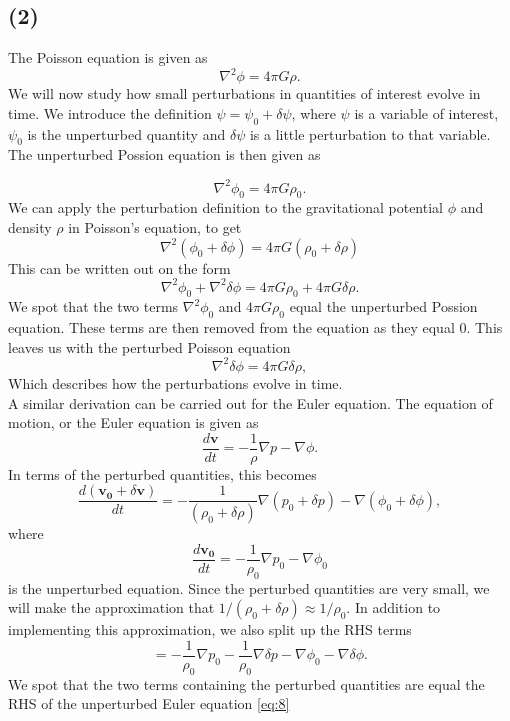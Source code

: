 \documentclass[a4paper]{article}
\begin{document}
\subsection*{(2)}

The Poisson equation is given as
\begin{equation}\label{eq:4}
\nabla^2 \phi = 4 \pi G \rho.
\end{equation}
We will now study how small perturbations in quantities of interest evolve in time. We introduce the definition $\psi = \psi_0 +\delta \psi$, where $\psi$ is a variable of interest, $\psi_0$ is the unperturbed quantity and $\delta \psi$ is a little perturbation to that variable. The unperturbed Possion equation is then given as

\begin{equation}\label{eq:5}
\nabla^2 \phi_0 = 4 \pi G \rho_0.
\end{equation}
We can apply the perturbation definition to the gravitational potential $\phi$ and density $\rho$ in Poisson's equation, to get
\[
\nabla^2 (\phi_0 + \delta \phi) = 4\pi G (\rho_0 + \delta \rho)
\]
This can be written out on the form
\[
\nabla^2 \phi_0 + \nabla^2 \delta \phi = 4 \pi G \rho_0 +4 \pi G \delta \rho.
\]
We spot that the two terms $\nabla^2 \phi_0$ and $4 \pi G \rho_0$ equal the unperturbed Possion equation. These terms are then removed from the equation as they equal 0. This leaves us with the perturbed Poisson equation
\begin{equation}\label{eq:6}
\nabla^2 \delta \phi = 4 \pi G \delta \rho,
\end{equation}
Which describes how the perturbations evolve in time.
\\

A similar derivation can be carried out for the Euler equation. The equation of motion, or the Euler equation is given as
\begin{equation}\label{eq:7}
    \frac{d \mathbf{v}}{dt} = - \frac{1}{\rho} \nabla p - \nabla \phi.
\end{equation}
In terms of the perturbed quantities, this becomes
\[
    \frac{d (\mathbf{v_0} + \delta \mathbf{v})}{dt} = - \frac{1}{(\rho_0 + \delta \rho)} \nabla (p_0 + \delta p) - \nabla (\phi_0 + \delta \phi),
\]
where 
\begin{equation}\label{eq:8}
    \frac{d\mathbf{v_0}}{dt} = - \frac{1}{\rho_0} \nabla p_0  - \nabla \phi_0
\end{equation}
is the unperturbed equation.
Since the perturbed quantities are very small, we will make the approximation that $1/(\rho_0+ \delta \rho) \approx 1/\rho_0$. In addition to implementing this approximation, we also split up the RHS terms
\[
= - \frac{1}{\rho_0} \nabla p_0 - \frac{1}{\rho_0} \nabla \delta p - \nabla \phi_0 - \nabla \delta \phi.
\]
We spot that the two terms containing the perturbed quantities are equal the RHS of the unperturbed Euler equation \eqref{eq:8}
\end{document}
